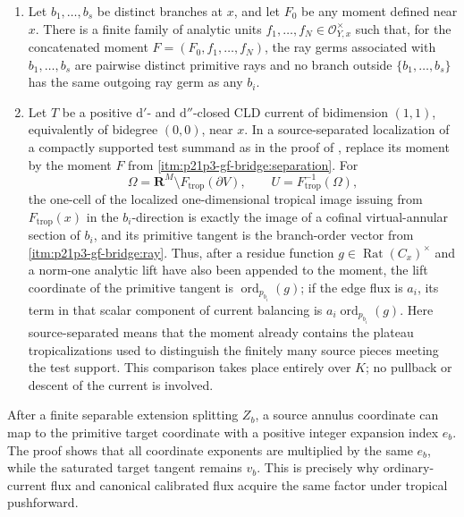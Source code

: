 \begin{proposition}
\begin{enumerate}
\item\label{itm:p21p3-gf-bridge:separation}
Let \(b_1,\ldots,b_s\) be distinct branches at \(x\), and let \(F_0\) be
any moment defined near \(x\).  There is a finite family of analytic units
\(f_1,\ldots,f_N\in\mathcal O_{Y,x}^{\times}\) such that, for the
concatenated moment \(F=(F_0,f_1,\ldots,f_N)\), the ray germs associated
with \(b_1,\ldots,b_s\) are pairwise distinct primitive rays and no branch
outside \(\{b_1,\ldots,b_s\}\) has the same outgoing ray germ as any
\(b_i\).

\item\label{itm:p21p3-gf-bridge:localization}
Let \(T\) be a positive \(\mathrm d'\)- and \(\mathrm d''\)-closed CLD
current of bidimension \((1,1)\), equivalently of bidegree \((0,0)\), near
\(x\).  In a source-separated
localization of a compactly supported test summand as in the proof of
\cite[Theorem~16.8.5]{CLD25}, replace its moment by the moment \(F\) from
\cref{itm:p21p3-gf-bridge:separation}.  For
\[
 \Omega=\mathbf R^{M}\setminus F_{\mathrm{trop}}(\partial V),
 \qquad
 U=F_{\mathrm{trop}}^{-1}(\Omega),
\]
the one-cell of the localized one-dimensional tropical image issuing from
\(F_{\mathrm{trop}}(x)\) in the \(b_i\)-direction is exactly the image of a
cofinal virtual-annular section of \(b_i\), and its primitive tangent is the
branch-order vector from
\cref{itm:p21p3-gf-bridge:ray}.  Thus, after a residue function
\(g\in\operatorname{Rat}(C_x)^\times\) and a norm-one analytic lift have
also been appended to the moment, the lift coordinate of the primitive
tangent is \(\operatorname{ord}_{p_{b_i}}(g)\); if the edge flux is
\(a_i\), its term in that scalar component of current balancing is
\(a_i\operatorname{ord}_{p_{b_i}}(g)\).  Here source-separated means that the
moment already contains the plateau tropicalizations used to distinguish
the finitely many source pieces meeting the test support.  This comparison
takes place entirely over \(K\); no pullback or descent of the current is
involved.
\end{enumerate}
\end{proposition}

\begin{remark}
\label{rem:p21p3-gf-virtual-annulus-index}
After a finite separable extension splitting \(Z_b\), a source annulus
coordinate can map to the primitive target coordinate with a positive
integer expansion index \(e_b\).  The proof shows that all coordinate
exponents are multiplied by the same \(e_b\), while the saturated target
tangent remains \(v_b\).  This is precisely why ordinary-current flux and
canonical calibrated flux acquire the same factor under tropical
pushforward.
\end{remark}
